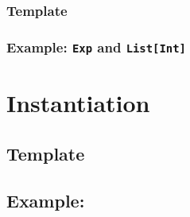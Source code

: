 \documentclass{article}
\begin{document}
\begin{spacing}{1.1}
\subsubsection{Template}

\subsubsection{Example: \lstinline{Exp} and \lstinline{List[Int]}}

\section{Instantiation}

\subsection{Template}

\subsection{Example: }


\end{spacing}
\end{document}

